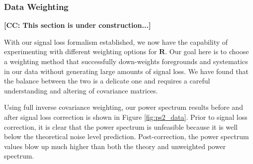 \documentclass[preprint2,numberedappendix,tighten]{aastex6}  %
\newcommand{\cc}[1]{{\color{purple} \textbf{[CC: #1]}}}
\begin{document}



\subsubsection{Data Weighting}
\label{sec:Weight}

\cc{This section is under construction...}

With our signal loss formalism established, we now have the capability of experimenting with different weighting options for $\textbf{R}$. Our goal here is to choose a weighting method that successfully down-weights foregrounds and systematics in our data without generating large amounts of signal loss. We have found that the balance between the two is a delicate one and requires a careful understanding and altering of covariance matrices.

Using full inverse covariance weighting, our power spectrum results before and after signal loss correction is shown in Figure \ref{fig:ps2_data}. Prior to signal loss correction, it is clear that the power spectrum is unfeasible because it is well below the theoretical noise level prediction. Post-correction, the power spectrum values blow up much higher than both the theory and unweighted power spectrum. 
\end{document}
